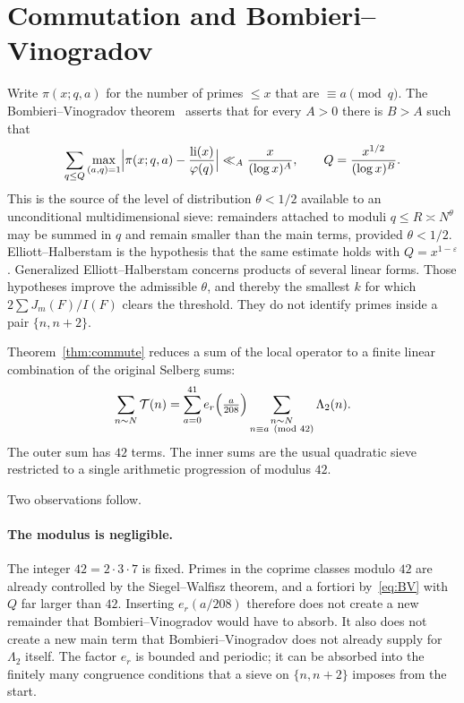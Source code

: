 \documentclass[11pt,a4paper]{article}
\theoremstyle{plain}
\theoremstyle{definition}
\theoremstyle{plain}
\numberwithin{equation}{section}
\begin{document}
\section{Commutation and Bombieri--Vinogradov}
\label{sec:BV}

Write \(\pi(x;q,a)\) for the number of primes \(\le x\) that are \(\equiv a\pmod{q}\). The Bombieri--Vinogradov theorem~\cite{Bombieri1965,Vinogradov1965} asserts that for every \(A>0\) there is \(B>A\) such that
\begin{equation}
\label{eq:BV}
\sum_{q\le Q}\max_{(a,q)=1}\Bigl|\pi(x;q,a)-\frac{\operatorname{li}(x)}{\varphi(q)}\Bigr|
\ll_A \frac{x}{(\log x)^A},
\qquad Q=\frac{x^{1/2}}{(\log x)^B}.
\end{equation}
This is the source of the level of distribution \(\theta<1/2\) available to an unconditional multidimensional sieve: remainders attached to moduli \(q\le R\asymp N^{\theta}\) may be summed in \(q\) and remain smaller than the main terms, provided \(\theta<1/2\). Elliott--Halberstam is the hypothesis that the same estimate holds with \(Q=x^{1-\varepsilon}\). Generalized Elliott--Halberstam concerns products of several linear forms. Those hypotheses improve the admissible \(\theta\), and thereby the smallest \(k\) for which \(2\sum J_m(F)/I(F)\) clears the threshold. They do not identify primes inside a pair \(\{n,n+2\}\).

Theorem~\ref{thm:commute} reduces a sum of the local operator to a finite linear combination of the original Selberg sums:
\begin{equation}
\label{eq:split}
\sum_{n\sim N}\mathcal{T}(n)
=\sum_{a=0}^{41}e_r\Bigl(\tfrac{a}{208}\Bigr)
\sum_{\substack{n\sim N\\ n\equiv a\pmod{42}}}\Lambda_2(n).
\end{equation}
The outer sum has \(42\) terms. The inner sums are the usual quadratic sieve restricted to a single arithmetic progression of modulus \(42\).

Two observations follow.

\paragraph{The modulus is negligible.}
The integer \(42=2\cdot 3\cdot 7\) is fixed. Primes in the coprime classes modulo \(42\) are already controlled by the Siegel--Walfisz theorem, and a fortiori by~\eqref{eq:BV} with \(Q\) far larger than \(42\). Inserting \(e_r(a/208)\) therefore does not create a new remainder that Bombieri--Vinogradov would have to absorb. It also does not create a new main term that Bombieri--Vinogradov does not already supply for \(\Lambda_2\) itself. The factor \(e_r\) is bounded and periodic; it can be absorbed into the finitely many congruence conditions that a sieve on \(\{n,n+2\}\) imposes from the start.
\end{document}
